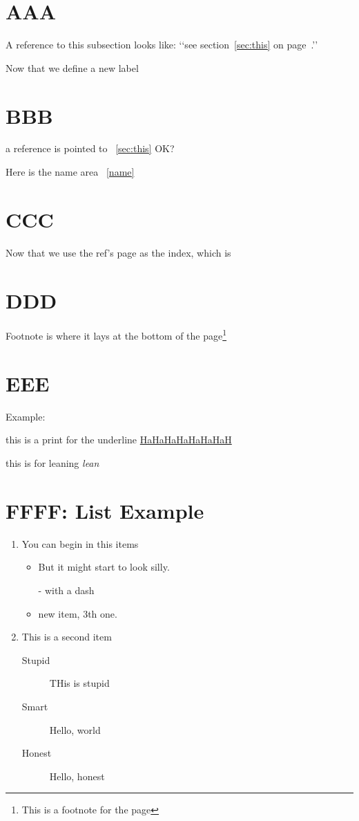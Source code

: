 \documentclass{article}
\begin{document}
\section{AAA}
A reference to this subsection
\label{sec:this} looks like:
‘‘see section~\ref{sec:this} on
page~\pageref{sec:this}.’’


Now that we define a new label \label{name}


\newpage

\section{BBB}
a reference is pointed to ~\ref{sec:this} OK?

Here is the name area ~\ref{name}

\newpage


\section{CCC}

Now that we use the ref's page as the index, which is ~\pageref{sec:this}



\section{DDD}

Footnote is where it lays at the bottom of the page\footnote{This is a footnote for the page}


\section{EEE}

Example:

this is a print for the underline \underline{HaHaHaHaHaHaHaH}

this is for leaning \emph{lean}

\section{FFFF: List Example}

\flushleft

\begin{enumerate} %
\item  You can begin in this items
\begin{itemize} %
\item But it might start to look silly.
\item[-] with a dash
\item new item, 3th one.
\end{itemize}

\item This is a second item
\begin{description}
\item[Stupid] THis is stupid
\item[Smart] Hello, world
\item[Honest] Hello, honest
\end{description}

\end{enumerate}
\end{document}
